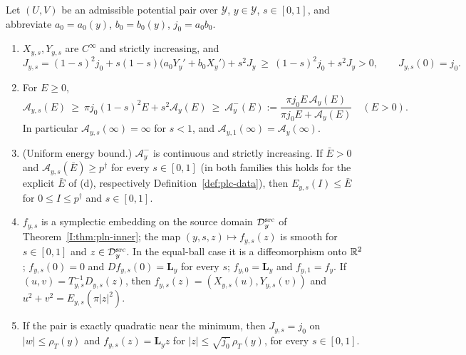 \begin{lemma}\label{I:lem:pln-energy}
Let $(U,V)$ be an admissible potential pair over $\mathcal Y$, $y\in\mathcal Y$, $s\in[0,1]$, and abbreviate
$a_0=a_0(y)$, $b_0=b_0(y)$, $j_0=a_0b_0$.
\begin{enumerate}[label=(\alph*)]
\item $X_{y,s},Y_{y,s}$ are $C^\infty$ and strictly increasing, and
 \[
  J_{y,s}=(1-s)^2j_0+s(1-s)\bigl(a_0Y_y'+b_0X_y'\bigr)+s^2J_y\ \ge\ (1-s)^2j_0+s^2J_y>0,\qquad J_{y,s}(0)=j_0 .
 \]
\item For $E\ge0$,
 \[
  \mathcal A_{y,s}(E)\ \ge\ \pi j_0(1-s)^2E+s^2\mathcal A_y(E)\ \ge\ \mathcal A^-_y(E):=\frac{\pi j_0E\,\mathcal A_y(E)}{\pi j_0E+\mathcal A_y(E)}\quad(E>0).
 \]
 In particular $\mathcal A_{y,s}(\infty)=\infty$ for $s<1$, and $\mathcal A_{y,1}(\infty)=\mathcal A_y(\infty)$.
\item (Uniform energy bound.) $\mathcal A^-_y$ is continuous and strictly increasing. If $\bar E>0$ and
 $\mathcal A_{y,s}(\bar E)\ge p^\dagger$ for every $s\in[0,1]$ (in both families this holds for the explicit $\bar E$ of
 (d), respectively Definition~\ref{def:plc-data}), then $E_{y,s}(I)\le\bar E$ for
 $0\le I\le p^\dagger$ and $s\in[0,1]$.
\item $f_{y,s}$ is a symplectic embedding on the source domain $\mathcal D_y^{\rm src}$ of Theorem~\ref{I:thm:pln-inner}; the map $(y,s,z)\mapsto f_{y,s}(z)$ is smooth for $s\in[0,1]$ and $z\in\mathcal D_y^{\rm src}$. In the equal-ball case it is a diffeomorphism onto $\mathbb{R}^2$; $f_{y,s}(0)=0$ and $Df_{y,s}(0)=\mathbf L_y$ for every $s$;
 $f_{y,0}=\mathbf L_y$ and $f_{y,1}=f_y$. If $(u,v)=T_{y,s}^{-1}D_{y,s}(z)$, then $f_{y,s}(z)=(X_{y,s}(u),Y_{y,s}(v))$ and
 $u^2+v^2=E_{y,s}(\pi|z|^2)$.
\item If the pair is exactly quadratic near the minimum, then $J_{y,s}=j_0$ on $|w|\le\rho_T(y)$ and
 $f_{y,s}(z)=\mathbf L_yz$ for $|z|\le\sqrt{j_0}\,\rho_T(y)$, for every $s\in[0,1]$.
\end{enumerate}
\end{lemma}

